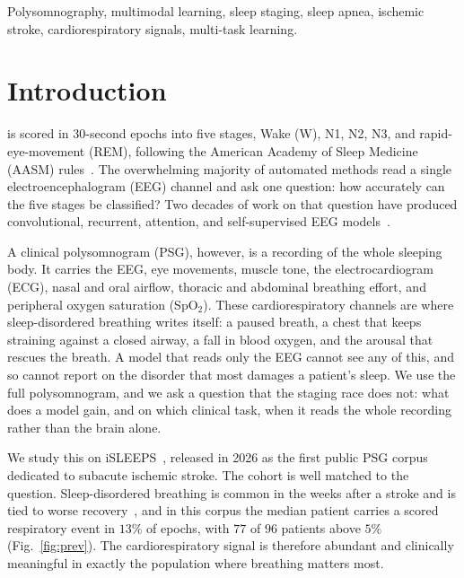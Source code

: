 \documentclass[journal]{IEEEtran}
\begin{document}
\begin{IEEEkeywords}
Polysomnography, multimodal learning, sleep staging, sleep apnea, ischemic stroke,
cardiorespiratory signals, multi-task learning.
\end{IEEEkeywords}

\section{Introduction}
 is scored in 30-second epochs into five stages, Wake (W), N1, N2,
N3, and rapid-eye-movement (REM), following the American Academy of Sleep Medicine (AASM)
rules~\cite{aasm2023manual}. The overwhelming majority of automated methods read a single
electroencephalogram (EEG) channel and ask one question: how accurately can the five stages
be classified? Two decades of work on that question have produced convolutional, recurrent,
attention, and self-supervised EEG models~\cite{supratak2017deepsleepnet,phan2019seqsleepnet,
eldele2021attnsleep,phan2021xsleepnet,labram2024,cbramod2025,eegpt2024}.

A clinical polysomnogram (PSG), however, is a recording of the whole sleeping body. It
carries the EEG, eye movements, muscle tone, the electrocardiogram (ECG), nasal and oral
airflow, thoracic and abdominal breathing effort, and peripheral oxygen saturation
(SpO$_2$). These cardiorespiratory channels are where sleep-disordered breathing writes
itself: a paused breath, a chest that keeps straining against a closed airway, a fall in
blood oxygen, and the arousal that rescues the breath. A model that reads only the EEG
cannot see any of this, and so cannot report on the disorder that most damages a patient's
sleep. We use the full polysomnogram, and we ask a question that the staging race does not:
what does a model gain, and on which clinical task, when it reads the whole recording rather
than the brain alone.

We study this on iSLEEPS~\cite{maiti2026isleeps}, released in 2026 as the first public PSG
corpus dedicated to subacute ischemic stroke. The cohort is well matched to the question.
Sleep-disordered breathing is common in the weeks after a stroke and is tied to worse
recovery~\cite{bassetti2006sleep,denis2024sleep}, and in this corpus the median patient
carries a scored respiratory event in $13\%$ of epochs, with $77$ of $96$ patients above
$5\%$ (Fig.~\ref{fig:prev}). The cardiorespiratory signal is therefore abundant and
clinically meaningful in exactly the population where breathing matters most.
\end{document}
